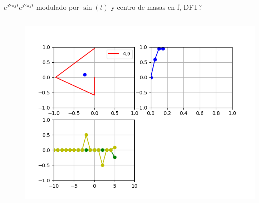 \begin{frame}{$e^{j2\pi ft}$}{$e^{j2\pi ft}$ modulado por $\sin(t)$ y centro de masas en f, DFT?}
   \handsonicon
   \begin{columns}[c]
      \hspace{2pt}
      \begin{column}{.3\textwidth}
         
      \end{column}
      \hspace{2pt}
      \vrule
      \hspace{2pt}
      \begin{column}{.3\textwidth}
         
      \end{column}
      \hspace{2pt}
      \vrule
      \hspace{2pt}
      \begin{column}{.4\textwidth}
         \centering\includegraphics[width=1.0\textwidth]{3_clase/euler4}
      \end{column}
      \hspace{2pt}
   \end{columns}
   \vfill
\end{frame}
